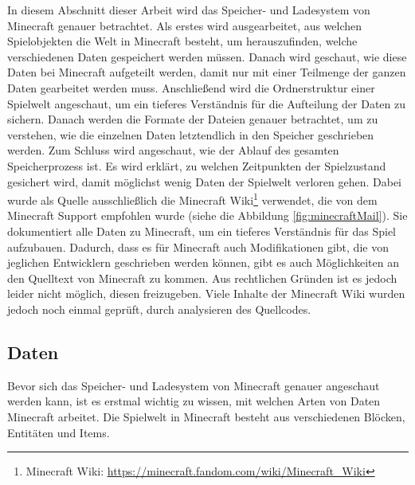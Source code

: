 In diesem Abschnitt dieser Arbeit wird das Speicher- und Ladesystem von Minecraft genauer betrachtet. Als erstes wird ausgearbeitet, aus welchen Spielobjekten die Welt in Minecraft besteht, um herauszufinden, welche verschiedenen Daten gespeichert werden müssen. Danach wird geschaut, wie diese Daten bei Minecraft aufgeteilt werden, damit nur mit einer Teilmenge der ganzen Daten gearbeitet werden muss. Anschließend wird die Ordnerstruktur einer Spielwelt angeschaut, um ein tieferes Verständnis für die Aufteilung der Daten zu sichern. Danach werden die Formate der Dateien genauer betrachtet, um zu verstehen, wie die einzelnen Daten letztendlich in den Speicher geschrieben werden. Zum Schluss wird angeschaut, wie der Ablauf des gesamten Speicherprozess ist. Es wird erklärt, zu welchen Zeitpunkten der Spielzustand gesichert wird, damit möglichst wenig Daten der Spielwelt verloren gehen. Dabei wurde als Quelle ausschließlich die Minecraft Wiki\footnote{ Minecraft Wiki: \url{https://minecraft.fandom.com/wiki/Minecraft_Wiki}} verwendet, die von dem Minecraft Support empfohlen wurde (siehe die Abbildung \ref{fig:minecraftMail}). Sie dokumentiert alle Daten zu Minecraft, um ein tieferes Verständnis für das Spiel aufzubauen. Dadurch, dass es für Minecraft auch Modifikationen gibt, die von jeglichen Entwicklern geschrieben werden können, gibt es auch Möglichkeiten an den Quelltext von Minecraft zu kommen. Aus rechtlichen Gründen ist es jedoch leider nicht möglich, diesen freizugeben. Viele Inhalte der Minecraft Wiki wurden jedoch noch einmal geprüft, durch analysieren des Quellcodes.



\subsection{Daten}
Bevor sich das Speicher- und Ladesystem von Minecraft genauer angeschaut werden kann, ist es erstmal wichtig zu wissen, mit welchen Arten von Daten Minecraft arbeitet. Die Spielwelt in Minecraft besteht aus verschiedenen Blöcken, Entitäten und Items. 

